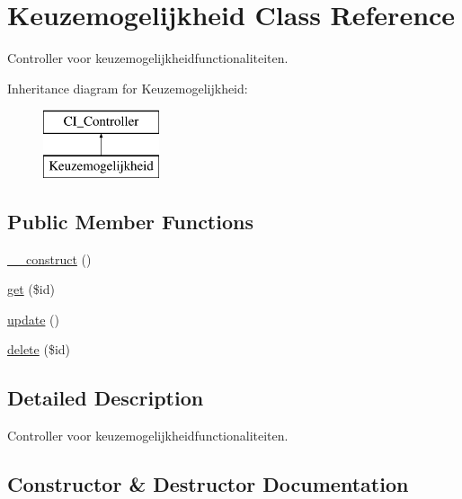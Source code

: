 \hypertarget{class_keuzemogelijkheid}{}\section{Keuzemogelijkheid Class Reference}
\label{class_keuzemogelijkheid}


Controller voor keuzemogelijkheidfunctionaliteiten.  


Inheritance diagram for Keuzemogelijkheid\+:\begin{figure}[H]
\begin{center}
\leavevmode
\includegraphics[height=2.000000cm]{class_keuzemogelijkheid}
\end{center}
\end{figure}
\subsection*{Public Member Functions}
\begin{DoxyCompactItemize}
\item 
\mbox{\hyperlink{class_keuzemogelijkheid_a11bdb9d39ff85f7e9a5a7f4f13eca123}{\+\_\+\+\_\+construct}} ()
\item 
\mbox{\hyperlink{class_keuzemogelijkheid_a507c36e7d7fd35a2a080524fce31ec4d}{get}} (\$id)
\item 
\mbox{\hyperlink{class_keuzemogelijkheid_ae621c2f2cc768da82291345a301f746a}{update}} ()
\item 
\mbox{\hyperlink{class_keuzemogelijkheid_a569638d382493486135eeea9b7d1cca5}{delete}} (\$id)
\end{DoxyCompactItemize}


\subsection{Detailed Description}
Controller voor keuzemogelijkheidfunctionaliteiten. 

\subsection{Constructor \& Destructor Documentation}
\mbox{\label{class_keuzemogelijkheid_a11bdb9d39ff85f7e9a5a7f4f13eca123}} 
